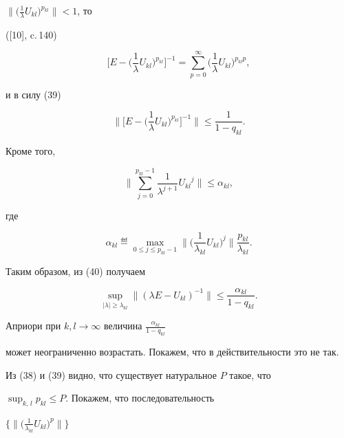 ${\big\|\big(\frac{1}{\lambda}U_{kl}\big)^{p_{kl}}\big\|< 1}$, то


([10], c.\,140)


$$


\bigg[E-\bigg(\frac{1}{\lambda}U_{kl}\bigg)^{p_{kl}}\bigg]^{-1}=


\sum_{p=0}^\infty\bigg(\frac{1}{\lambda}U_{kl}\bigg)^{p_{kl}p},


$$


и в силу (39)


$$


\bigg\|\bigg[E-\bigg(\frac{1}{\lambda}U_{kl}


\bigg)^{p_{kl}}\bigg]^{-1}\bigg\|\le


\frac{1}{1-q_{kl}}.


$$


Кроме того,


$$


\bigg\|\sum_{j=0}^{p_{kl}-1}\frac{1}


{\lambda^{j+1}}{U_{kl}}^j\bigg\|\le \alpha_{kl},


$$


где


\begin{equation}


\alpha_{kl}\eqdef \max_{0\le j\le p_{kl}-1}


\bigg\|\bigg(\frac{1}{\lambda_{kl}}U_{kl}\bigg)^j\bigg\|


\frac{p_{kl}}{\lambda_{kl}}.


\end{equation}


Таким образом, из (40) получаем


$$


\sup_{|\lambda|\ge\lambda_{kl}}\|(\lambda E-U_{kl})^{-1}\|\le


\frac{\alpha_{kl}}{1-q_{kl}}.


$$





Априори при $k,l\to\infty$ величина ${\frac{\alpha_{kl}}{1-q_{kl}}}$


может неограниченно возрастать. Покажем, что в действительности это не так.


Из (38) и (39) видно, что существует натуральное $P$ такое, что


${\displaystyle\sup_{k,\,l}p_{kl}\le P}$. Покажем, что последовательность


$\big\{\big\|\big(\frac{1}{\lambda_{kl}}U_{kl}\big)^p\big\|\big\}$


